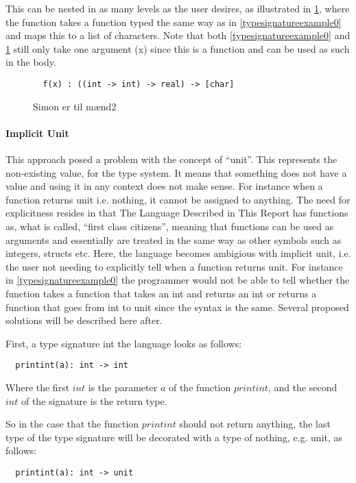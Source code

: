 This can be nested in as many levels as the user desires, as illustrated in \cref{typesignatureexample1}, where the function takes a function typed the same way as in \cref{typesignatureexample0} and maps this to a list of characters. Note that both \cref{typesignatureexample0} and \cref{typesignatureexample1} still only take one argument (x) since this is a function and can be used as such in the body.

\begin{figure}
\begin{lstlisting}
  f(x) : ((int -> int) -> real) -> [char]
\end{lstlisting}
\caption{Simon er til mænd2}
\label{typesignatureexample1}
\end{figure}

\paragraph{Implicit Unit}
This approach posed a problem with the concept of \enquote{unit}. This represents the non-existing value, for the type system. It means that something does not have a value and using it in any context does not make sense. For instance when a function returns unit i.e. nothing, it cannot be assigned to anything. The need for explicitness resides in that The Language Described in This Report has functions as, what is called, \enquote{first class citizens}, meaning that functions can be used as arguments and essentially are treated in the same way as other symbols such as integers, structs etc. Here, the language becomes ambigious with implicit unit, i.e. the user not needing to explicitly tell when a function returns unit. For instance in \cref{typesignatureexample0} the programmer would not be able to tell whether the function takes a function that takes an int and returns an int or returns a function that goes from int to unit since the syntax is the same.
Several proposed solutions will be described here after.

First, a type signature int the language looks as follows:
\begin{verbatim}
  printint(a): int -> int
\end{verbatim}
Where the first $int$ is the parameter $a$ of the function $printint$, and the second $int$ of the signature is the return type.

So in the case that the function $printint$ should not return anything, the last type of the type signature will be decorated with a type of nothing, e.g. unit, as follows:
\begin{verbatim}
  printint(a): int -> unit
\end{verbatim}

